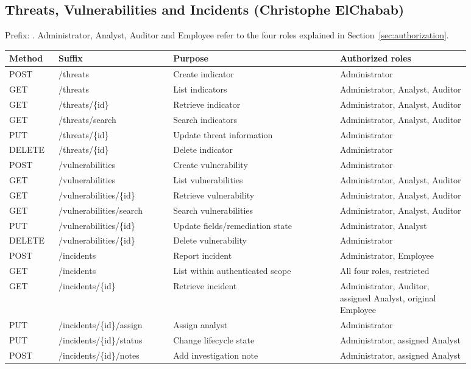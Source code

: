 \documentclass[11pt,a4paper]{article}
\begin{document}
\subsection{Threats, Vulnerabilities and Incidents (Christophe ElChabab)}
Prefix: . Administrator, Analyst, Auditor and Employee refer to the four roles explained in Section~\ref{sec:authorization}.
\begin{small}
\begin{longtable}{>{\raggedright\arraybackslash}p{0.09\linewidth}>{\raggedright\arraybackslash}p{0.22\linewidth}>{\raggedright\arraybackslash}p{0.32\linewidth}>{\raggedright\arraybackslash}p{0.25\linewidth}}
\toprule\textbf{Method} & \textbf{Suffix} & \textbf{Purpose} & \textbf{Authorized roles}\\\midrule\endhead
POST & /threats & Create indicator & Administrator\\
GET & /threats & List indicators & Administrator, Analyst, Auditor\\
GET & /threats/\{id\} & Retrieve indicator & Administrator, Analyst, Auditor\\
GET & /threats/search & Search indicators & Administrator, Analyst, Auditor\\
PUT & /threats/\{id\} & Update threat information & Administrator\\
DELETE & /threats/\{id\} & Delete indicator & Administrator\\
POST & /vulnerabilities & Create vulnerability & Administrator\\
GET & /vulnerabilities & List vulnerabilities & Administrator, Analyst, Auditor\\
GET & /vulnerabilities/\{id\} & Retrieve vulnerability & Administrator, Analyst, Auditor\\
GET & /vulnerabilities/search & Search vulnerabilities & Administrator, Analyst, Auditor\\
PUT & /vulnerabilities/\{id\} & Update fields/remediation state & Administrator, Analyst\\
DELETE & /vulnerabilities/\{id\} & Delete vulnerability & Administrator\\
POST & /incidents & Report incident & Administrator, Employee\\
GET & /incidents & List within authenticated scope & All four roles, restricted\\
GET & /incidents/\{id\} & Retrieve incident & Administrator, Auditor, assigned Analyst, original Employee\\
PUT & /incidents/\{id\}/assign & Assign analyst & Administrator\\
PUT & /incidents/\{id\}/status & Change lifecycle state & Administrator, assigned Analyst\\
POST & /incidents/\{id\}/notes & Add investigation note & Administrator, assigned Analyst\\\bottomrule
\end{longtable}\end{small}
\end{document}
